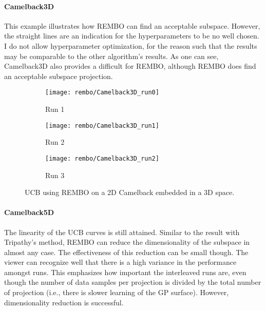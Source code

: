 \paragraph{Camelback3D}
This example illustrates how REMBO can find an acceptable subspace.
However, the straight lines are an indication for the hyperparameters to be no well chosen.
I do not allow hyperparameter optimization, for the reason such that the results may be comparable to the other algorithm's results.
As one can see, Camelback3D also provides a difficult for REMBO, although REMBO does find an acceptable subspace projection.

\begin{figure}[H]
\center
    \begin{subfigure}[b]{0.30\textwidth}
        \texttt{[image: rembo/Camelback3D\_run0]}
        \label{fig:gull}
         \caption{Run 1}
    \end{subfigure}
        \begin{subfigure}[b]{0.30\textwidth}
        \texttt{[image: rembo/Camelback3D\_run1]}
        \label{fig:gull}
        \caption{Run 2}
    \end{subfigure}
    \begin{subfigure}[b]{0.30\textwidth}
        \texttt{[image: rembo/Camelback3D\_run2]}
        \label{fig:gull}
               \caption{Run 3}
    \end{subfigure}
        \caption{UCB using REMBO on a 2D Camelback embedded in a 3D space.
    }\label{fig:animals}
\end{figure}

\paragraph{Camelback5D}
The linearity of the UCB curves is still attained.
Similar to the result with Tripathy's method, REMBO can reduce the dimensionality of the subspace in almost any case.
The effectiveness of this reduction can be small though.
The viewer can recognize well that there is a high variance in the performance amongst runs.
This emphasizes how important the interleaved runs are, even though the number of data samples per projection is divided by the total number of projection (i.e., there is slower learning of the GP surface). However, dimensionality reduction is successful.

